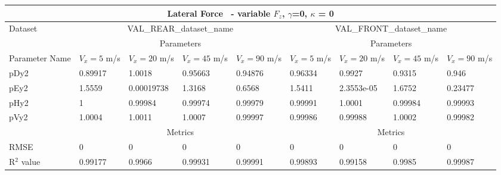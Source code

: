         \begin{tabular}{lllll|llll} \hline \multicolumn{9}{c}{Lateral Force~ - variable $F_z$, $\gamma$=0, $\kappa$ = 0}                                                                                                                                                                        \\ \hline Dataset                         & \multicolumn{4}{c|}{VAL\_REAR\_dataset\_name}                                                & \multicolumn{4}{c}{VAL\_FRONT\_dataset\_name}                                                     \\ \hline \multicolumn{1}{c}{}            & \multicolumn{4}{c|}{Parameters}                                                              & \multicolumn{4}{c}{Parameters}                                                                    \\ \hline Parameter Name                  & $V_x = 5$ m/s     & $V_x = 20$ m/s     & $V_x = 45$ m/s     & $V_x = 90$ m/s     & $V_x = 5$ m/s      & $V_x = 20$ m/s      & $V_x = 45$ m/s      & $V_x = 90$ m/s       \\ pDy2                            & 0.89917 & 1.0018 & 0.95663 & 0.94876 & 0.96334 & 0.9927 & 0.9315 & 0.946  \\ pEy2                            & 1.5559 & 0.00019738 & 1.3168 & 0.6568 & 1.5411 & 2.3553e-05 & 1.6752 & 0.23477  \\ pHy2                            & 1 & 0.99984 & 0.99974 & 0.99979 & 0.99991 & 1.0001 & 0.99984 & 0.99993  \\ pVy2                            & 1.0004 & 1.0011 & 1.0007 & 0.99997 & 0.99986 & 0.99988 & 1.0002 & 0.99982  \\ \hline \multicolumn{1}{c|}{}           & \multicolumn{4}{c|}{Metrics}                                                                 & \multicolumn{4}{c}{Metrics}                                                                       \\ \hline RMSE                            & 0 & 0 & 0 & 0 & 0 & 0 & 0 & 0  \\ R$^2$ value                       & 0.99177   & 0.9966   & 0.99931   & 0.99991   & 0.99893   & 0.99158   & 0.9985   & 0.99987    \\ \hline \end{tabular} 